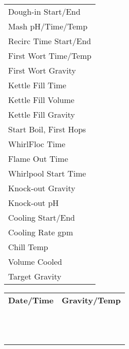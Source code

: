 \documentclass[12pt]{article}
\newcommand{\formline}[1][4cm]{\uline{\hspace{#1}}}
\begin{document}
\begin{multicols}{2}
\noindent
\begin{tabular}{l}
Dough-in Start/End \formline[5.5cm] \\
Mash pH/Time/Temp \formline[5.5cm] \\
Recirc Time Start/End \formline[5cm] \\
First Wort Time/Temp \formline[5cm] \\
First Wort Gravity \formline[5.5cm] \\
Kettle Fill Time \formline[6cm] \\
Kettle Fill Volume \formline[5.8cm] \\
Kettle Fill Gravity \formline[5.8cm] \\
Start Boil, First Hops \formline[5cm] \\
WhirlFloc Time \formline[6cm] \\
Flame Out Time \formline[6cm] \\
Whirlpool Start Time \formline[5.5cm] \\
Knock-out Gravity \formline[5.8cm] \\
Knock-out pH \formline[6.5cm] \\
Cooling Start/End \formline[5.8cm] \\
Cooling Rate gpm \formline[6cm] \\
Chill Temp \formline[6.8cm] \\
Volume Cooled \formline[6cm] \\
Target Gravity \formline[6.2cm]
\end{tabular}

\columnbreak

\noindent{}

\vspace{0.5cm}

\noindent
\begin{tabular}{@{}p{4.2cm}@{}p{4.2cm}@{}}
\textbf{Date/Time} & \textbf{Gravity/Temp} \\[0.3cm]
\formline[4cm] & \formline[4cm] \\[0.5cm]
\formline[4cm] & \formline[4cm] \\[0.5cm]
\formline[4cm] & \formline[4cm] \\[0.5cm]
\formline[4cm] & \formline[4cm] \\[0.5cm]
\formline[4cm] & \formline[4cm] \\[0.5cm]
\formline[4cm] & \formline[4cm] \\[0.5cm]
\formline[4cm] & \formline[4cm] \\[0.5cm]
\formline[4cm] & \formline[4cm] \\[0.5cm]
\formline[4cm] & \formline[4cm] \\[0.5cm]
\formline[4cm] & \formline[4cm] \\[0.5cm]
\formline[4cm] & \formline[4cm] \\[0.5cm]
\formline[4cm] & \formline[4cm]
\end{tabular}

\end{multicols}
\end{document}
